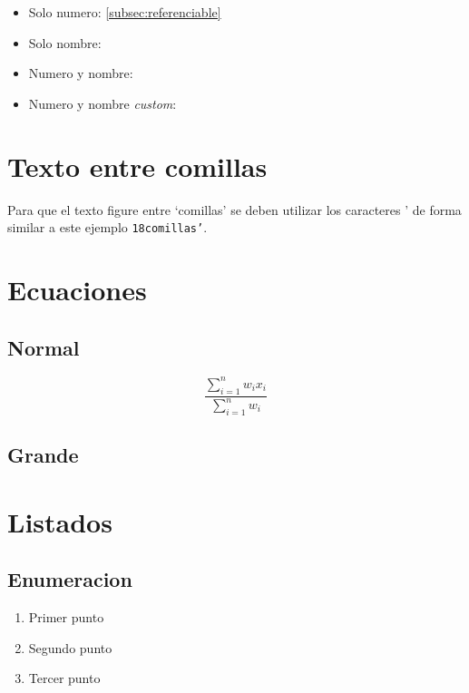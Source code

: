             \begin{itemize}
                \item Solo numero: \ref{subsec:referenciable}
                \item Solo nombre: 
                \item Numero y nombre: 
                \item Numero y nombre \textit{custom}: 
            \end{itemize}
        
    \section{Texto entre comillas}
        Para que el texto figure entre `comillas' se deben utilizar los caracteres \string' de forma similar a este ejemplo \texttt{\char18comillas\string'}.

    \section{Ecuaciones}
        \subsection{Normal}
        \begin{equation}
                {\frac {\sum \limits _{i=1}^{n}w_{i}x_{i}}{\sum \limits _{i=1}^{n}w_{i}}}
        \end{equation}
        
        \subsection{Grande}
        \begin{equationBig}
                {}
        \end{equationBig}
        
    \section{Listados}
        \subsection{Enumeracion}
        
            \begin{enumerate}
                \item Primer punto
                \item Segundo punto
                \item Tercer punto
            \end{enumerate}
            
